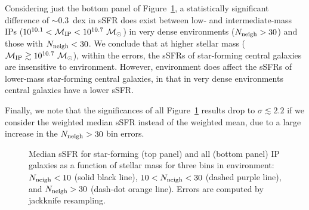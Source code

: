 Considering just the bottom panel of Figure~\ref{fig:sSFR_vs_mstar}, a statistically significant difference of $\sim0.3$~dex in sSFR
does exist between low- and intermediate-mass IPs (${10^{10.1}<\mIP<10^{10.7}~\msun}$) in very dense environments (${\Nneigh>30}$) and those with ${\Nneigh<30}$.
We conclude that at higher stellar mass ($\mIP\gtrsim10^{10.7}~\msun$), within the errors, the sSFRs of star-forming central galaxies are insensitive to environment.
However, environment does affect the sSFRs of lower-mass star-forming central galaxies,
in that in very dense environments central galaxies have a lower sSFR.

Finally, we note that the significances of all Figure~\ref{fig:sSFR_vs_mstar} results drop to ${\sigma\lesssim2.2}$ if we consider the weighted median sSFR instead of the weighted mean, due to a large increase in the ${\Nneigh>30}$ bin errors.


%
%

\begin{figure}
  \epstrim{0in 0.1in 0.4in 0.7in}
  \caption{
Median sSFR for star-forming (top panel) and all (bottom panel) IP galaxies as a function of stellar mass for three bins in environment:~${\Nneigh<10}$ (solid black line), ${10<\Nneigh<30}$ (dashed purple line), and ${\Nneigh>30}$ (dash-dot orange line). Errors are computed by jackknife resampling.
}
  \label{fig:sSFR_vs_mstar}
\end{figure}

